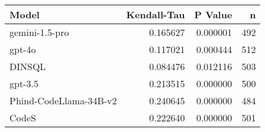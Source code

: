\begin{tabular}{lrrr}
\toprule
Model & Kendall-Tau & P Value & n \\
\midrule
gemini-1.5-pro & 0.165627 & 0.000001 & 492 \\
gpt-4o & 0.117021 & 0.000444 & 512 \\
DINSQL & 0.084476 & 0.012116 & 503 \\
gpt-3.5 & 0.213515 & 0.000000 & 500 \\
Phind-CodeLlama-34B-v2 & 0.240645 & 0.000000 & 484 \\
CodeS & 0.222640 & 0.000000 & 501 \\
\bottomrule
\end{tabular}
